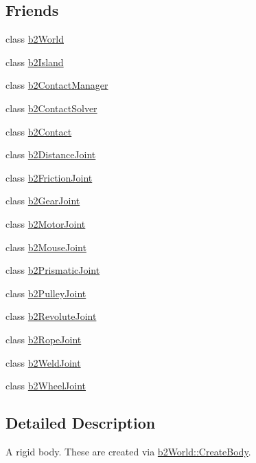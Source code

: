 \subsection*{Friends}
\begin{DoxyCompactItemize}
\item 
class \mbox{\hyperlink{classb2_body_a4bd536c5a7c0587913765bbc2693ceea}{b2\+World}}
\item 
class \mbox{\hyperlink{classb2_body_afc682950b8c4f251804fc1938663098b}{b2\+Island}}
\item 
class \mbox{\hyperlink{classb2_body_aece264d42f69aed410f5eb3beba6ddf2}{b2\+Contact\+Manager}}
\item 
class \mbox{\hyperlink{classb2_body_afb788a7ba90344f3ddbafff3de0465c4}{b2\+Contact\+Solver}}
\item 
class \mbox{\hyperlink{classb2_body_a6c4ac5df27ec498dd9e4281352b7a789}{b2\+Contact}}
\item 
class \mbox{\hyperlink{classb2_body_ab574994230041b2ee9717de78866b74f}{b2\+Distance\+Joint}}
\item 
class \mbox{\hyperlink{classb2_body_a00cce0630ae86cbf33214a6a7716b684}{b2\+Friction\+Joint}}
\item 
class \mbox{\hyperlink{classb2_body_a13c275221e30bb485e17e4e04553cb71}{b2\+Gear\+Joint}}
\item 
class \mbox{\hyperlink{classb2_body_ac5b29e17373357870c7e1b8dd41c78d1}{b2\+Motor\+Joint}}
\item 
class \mbox{\hyperlink{classb2_body_af778d9e4de5da0fbcfada1615344cf86}{b2\+Mouse\+Joint}}
\item 
class \mbox{\hyperlink{classb2_body_a78ff31fe08bbb0c83ad03ba6dfb9d78c}{b2\+Prismatic\+Joint}}
\item 
class \mbox{\hyperlink{classb2_body_af7861e214216f26a70b7596130e0326f}{b2\+Pulley\+Joint}}
\item 
class \mbox{\hyperlink{classb2_body_aa6afb0f5dc73f101a6fc3a3c63abedf8}{b2\+Revolute\+Joint}}
\item 
class \mbox{\hyperlink{classb2_body_ab24edbcb929fa9bd24b92d6006c00ab2}{b2\+Rope\+Joint}}
\item 
class \mbox{\hyperlink{classb2_body_a9fafe51e7203fdb53358c75e1c41142b}{b2\+Weld\+Joint}}
\item 
class \mbox{\hyperlink{classb2_body_a715f06ed5bb576994cd50d0b99cc18ec}{b2\+Wheel\+Joint}}
\end{DoxyCompactItemize}


\subsection{Detailed Description}
A rigid body. These are created via \mbox{\hyperlink{classb2_world_a2eb36e967e43294bfa03ec3d177c2dae}{b2\+World\+::\+Create\+Body}}. 


